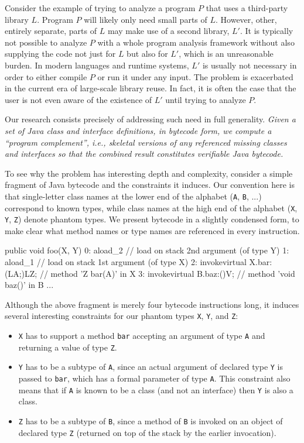 \documentclass{llncs}
\newcommand{\code}[1]{\texttt{#1}}
\begin{document}
Consider the example of trying to analyze a program $P$ that uses a
third-party library $L$. Program $P$ will likely only need small parts
of $L$.  However, other, entirely separate, parts of $L$ may make use
of a second library, $L'$.  It is typically not possible to analyze
$P$ with a whole program analysis framework without also supplying the
code not just for $L$ but also for $L'$, which is an unreasonable
burden. In modern languages and runtime systems, $L'$ is usually not
necessary in order to either compile $P$ or run it under any
input. The problem is exacerbated in the current era of large-scale
library reuse.  In fact, it is often the case that the user is not
even aware of the existence of $L'$ until trying to analyze $P$.

Our research consists precisely of addressing such need in full
generality. \emph{Given a set of Java class and interface definitions,
  in bytecode form, we compute a ``program complement'', i.e.,
  skeletal versions of any referenced missing classes and interfaces
  so that the combined result constitutes verifiable Java bytecode.}

To see why the problem has interesting depth and complexity,
consider a simple fragment of Java bytecode and the constraints it
induces. Our convention here is that single-letter class names at
the lower end of the alphabet (\code{A}, \code{B}, ...)  correspond
to known types, while class names at the high end of the alphabet
(\code{X}, \code{Y}, \code{Z}) denote phantom types.  We present
bytecode in a slightly condensed form, to make clear what method
names or type names are referenced in every instruction.

\begin{bytecode}
  public void foo(X, Y)
  0: aload_2     // load on stack 2nd argument (of type Y)
  1: aload_1     // load on stack 1st argument (of type X)
  2: invokevirtual X.bar:(LA;)LZ; // method 'Z bar(A)' in X
  3: invokevirtual B.baz:()V;     // method 'void baz()' in B
   ...
\end{bytecode}

Although the above fragment is merely four bytecode instructions
long, it induces several interesting constraints for our phantom
types \code{X}, \code{Y}, and \code{Z}:

\begin{itemize}[--]
\item \code{X} has to support a method \code{bar} accepting an
  argument of type \code{A} and returning a value of type \code{Z}.
\item \code{Y} has to be a subtype of \code{A}, since an actual
  argument of declared type \code{Y} is passed to \code{bar}, which
  has a formal parameter of type \code{A}. This constraint also
  means that if \code{A} is known to be a class (and not an
  interface) then \code{Y} is also a class.
\item \code{Z} has to be a subtype of \code{B}, since a method of
  \code{B} is invoked on an object of declared type \code{Z} (returned
  on top of the stack by the earlier invocation).
\end{itemize}
\end{document}
